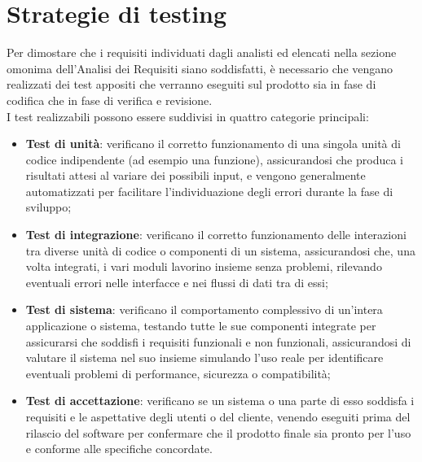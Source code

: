 \section{Strategie di testing}
Per dimostare che i requisiti individuati dagli analisti ed elencati nella sezione omonima dell'Analisi dei Requisiti siano soddisfatti, è necessario che vengano realizzati dei test appositi che verranno eseguiti sul prodotto sia in fase di codifica che in fase di verifica e revisione.\\
I test realizzabili possono essere suddivisi in quattro categorie principali:
\begin{itemize}
    \item \textbf{Test di unità}: verificano il corretto funzionamento di una singola unità di codice indipendente (ad esempio una funzione), assicurandosi che produca i risultati attesi al variare dei possibili input, e vengono generalmente automatizzati per facilitare l'individuazione degli errori durante la fase di sviluppo;
    \item \textbf{Test di integrazione}: verificano il corretto funzionamento delle interazioni tra diverse unità di codice o componenti di un sistema, assicurandosi che, una volta integrati, i vari moduli lavorino insieme senza problemi, rilevando eventuali errori nelle interfacce e nei flussi di dati tra di essi;
    \item \textbf{Test di sistema}: verificano il comportamento complessivo di un'intera applicazione o sistema, testando tutte le sue componenti integrate per assicurarsi che soddisfi i requisiti funzionali e non funzionali, assicurandosi di valutare il sistema nel suo insieme simulando l'uso reale per identificare eventuali problemi di performance, sicurezza o compatibilità;
    \item \textbf{Test di accettazione}: verificano se un sistema o una parte di esso soddisfa i requisiti e le aspettative degli utenti o del cliente, venendo eseguiti prima del rilascio del software per confermare che il prodotto finale sia pronto per l'uso e conforme alle specifiche concordate.
\end{itemize}

